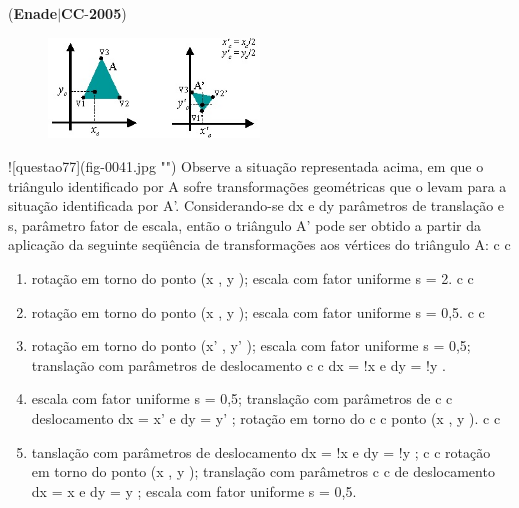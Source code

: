 \documentclass{exam}
\begin{document}
\begin{questions}
\begin{enumerate}[label=\alph*)]
	\end{enumerate}

\question (\textbf{Enade}$|$\textbf{CC}-\textbf{2005}) \begin{figure}[H]
	\begin{center}
		\includegraphics[width=0.5\textwidth]{CIENCIA_DA_COMPUTACAO_Prova2005-utf8_figuras/fig-0041.jpg}
		\caption{}
	\end{center}
\end{figure}
![questao77](fig-0041.jpg "")
Observe a situação representada acima, em que o triângulo
identificado por A sofre transformações geométricas que o levam para
a situação identificada por A’. Considerando-se dx e dy parâmetros
de translação e s, parâmetro fator de escala, então o triângulo A’ pode
ser obtido a partir da aplicação da seguinte seqüência de
transformações aos vértices do triângulo A:
c c
	\begin{enumerate}[label=\alph*)]
		\item  rotação em torno do ponto (x , y ); escala com fator uniforme
s = 2.
c c
		\item  rotação em torno do ponto (x , y ); escala com fator uniforme
s = 0,5.
c c
		\item  rotação em torno do ponto (x' , y' ); escala com fator
uniforme s = 0,5; translação com parâmetros de deslocamento
c c
dx = !x e dy = !y .
		\item  escala com fator uniforme s = 0,5; translação com parâmetros de
c c
deslocamento dx = x' e dy = y' ; rotação em torno do
c c
ponto (x , y ).
c c
		\item  tanslação com parâmetros de deslocamento dx = !x e dy = !y ;
c c
rotação em torno do ponto (x , y ); translação com parâmetros
c c
de deslocamento dx = x e dy = y ; escala com fator uniforme
s = 0,5.

	\end{enumerate}


\end{questions}
\end{document}

